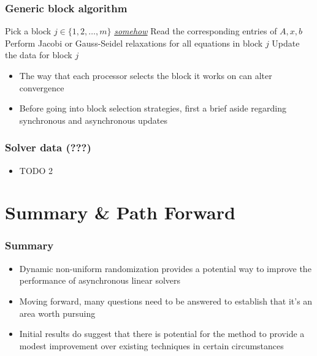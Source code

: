 \documentclass{beamer}
\begin{document}
\begin{frame}
	\frametitle{Generic block algorithm}
	\begin{algorithm}[H]
		\DontPrintSemicolon
		 {
			 {
				Pick a block $j \in \{1, 2, \ldots, m\}$ {\em{\underline{somehow}}} \; 
				Read the corresponding entries of $A, x, b$ \;
				Perform Jacobi or Gauss-Seidel relaxations for all equations in block $j$ \;
				Update the data for block $j$ \;
			}
		}
	\end{algorithm}
	\begin{itemize}
		\item The way that each processor selects the block it works on can alter convergence
		\item Before going into block selection strategies, first a brief aside regarding synchronous and asynchronous updates
	\end{itemize}
\end{frame}

\begin{frame}
	\frametitle{Solver data (???)}
	\begin{itemize}
	    \item TODO 2
	\end{itemize}
\end{frame}




\section{Summary \& Path Forward}

\begin{frame}
	\frametitle{Summary}
	\begin{itemize}
		\item Dynamic non-uniform randomization provides a potential way to improve the performance of asynchronous linear solvers
		\item Moving forward, many questions need to be answered to establish that it's an area worth pursuing
		\item Initial results do suggest that there is potential for the method to provide a modest improvement over existing techniques in certain circumstances
	\end{itemize}
\end{frame}
\end{document}
